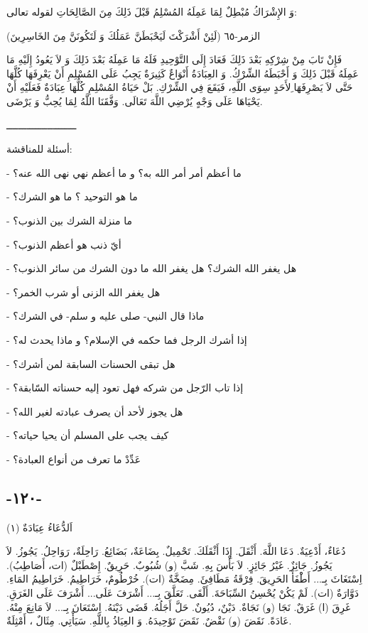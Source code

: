 \documentclass[a5paper]{article}
\begin{document}
وَ الإِشْرَاكُ مُبْطِلٌ لِمَا عَمِلَهُ المُسْلِمُ قَبْلَ ذَلِكَ مِنَ الصَّالِحَاتِ لقوله تعالى:

(لَئِنْ أَشْرَكْتَ لَيَحْبَطَنَّ عَمَلُكَ وَ لَتَكُونَنَّ مِنَ الخَاسِرِينَ) الزمر-٦٥

فَإِنْ تَابَ مِنْ شِرْكِهِ بَعْدَ ذَلِكَ فَعَادَ إِلَى التَّوْحِيدِ فَلَهُ مَا عَمِلَهُ بَعْدَ ذَلِكَ وَ لاَ يَعُودُ إِلَيْهِ مَا عَمِلَهُ قَبْلَ ذَلِكَ وَ أَحْبَطَهُ الشِّرْكُ. وَ العِبَادَةُ أَنْوَاعٌ كَثِيرَةٌ يَجِبُ عَلَى المُسْلِمِ أَنْ يَعْرِفَهَا كُلَّهَا حَتَّى لاَ يَصْرِفَهَا ِلأَحَدٍ سِوَى اللَّهِ، فَيَقَعَ فِي الشِّرْكِ. بَلْ حَيَاةُ المُسْلِمِ كُلُّهَا عِبَادَةٌ فَعَلَيْهِ أَنْ يَحْيَاهَا عَلَى وَجْهٍ يُرْضِي اللَّهَ تَعَالَى. وَفَّقَنَا اللَّهُ لِمَا يُحِبُّ وَ يَرْضَى. 

ــــــــــــــــــــــــ

أسئلة للمناقشة:

- ما أعظم أمر أمر الله به؟ و ما أعظم نهي نهى الله عنه؟

- ما هو التوحيد ؟ ما هو الشرك؟

- ما منزلة الشرك بين الذنوب؟

- أيّ ذنب هو أعظم الذنوب؟

- هل يغفر الله الشرك؟ هل يغفر الله ما دون الشرك من سائر الذنوب؟

- هل يغفر الله الزنى أو شرب الخمر؟

- ماذا قال النبي- صلى عليه و سلم- في الشرك؟

- إذا أشرك الرجل فما حكمه في الإسلام؟ و ماذا يحدث له؟

- هل تبقى الحسنات السابقة لمن أشرك؟

- إذا تاب الرّجل من شركه فهل تعود إليه حسناته السّابقة؟

- هل يجوز لأحد أن يصرف عبادته لغير الله؟

- كيف يجب على المسلم أن يحيا حياته؟

- عَدِّدْ ما تعرف من أنواع العبادة؟

\subsection{-١٢٠-}
اَلدُّعَاءُ عِبَادَةٌ (١)

دُعَاءٌ، أَدْعِيَةٌ. دَعَا اللَّهَ. أَثْقَلَ. إِذَا أَثْقَلَكَ. تَحْمِيلٌ. بِضَاعَةٌ، بَضَائِعُ. رَاحِلَةٌ، رَوَاحِلُ. يَجُوزُ. لاَ يَجُوزُ. جَائِزٌ. غَيْرُ جَائِزٍ. لاَ بَأْسَ بِهِ. شَبَّ (و) شُبُوبٌ. حَرِيقٌ. إِصْطَبْلٌ (ات، أَصَاطِبُ). اِسْتَغَاثَ بِـ... أَطْْفَأَ الحَرِيقَ. فِرْقَةُ مَطَافِئَ. مِضَخَّةٌ (ات). خُرْطُومٌ، خَرَاطِيمُ. خَرَاطِيمُ المَاءِ. دَوَّارَةٌ (ات). لَمْ يَكُنْ يُحْسِنُ السِّبَاحَةَ. أَلْقَى. تَعَلَّقَ بِـ... أَشْرَفَ عَلَى... أَشْرَفَ عَلَى الغَرَقِ. غَرِقَ (ا) غَرَقٌ. نَجَا (و) نَجَاةٌ. دَيْنٌ، دُيُونٌ. حَلَّ أَجَلُهُ. قَضَى دَيْنَهُ. اِسْتَعَانَ بِـ... لاَ مَانِعَ مِنْهُ. عَادَةً. نَقَضَ (و) نَقْضٌ. نَقَضَ تَوْحِيدَهُ. وَ العِيَاذُ بِاللَّهِ. سَيَأْتِي. مِثَالٌ ، أَمْثِلَةٌ. 
\end{document}
